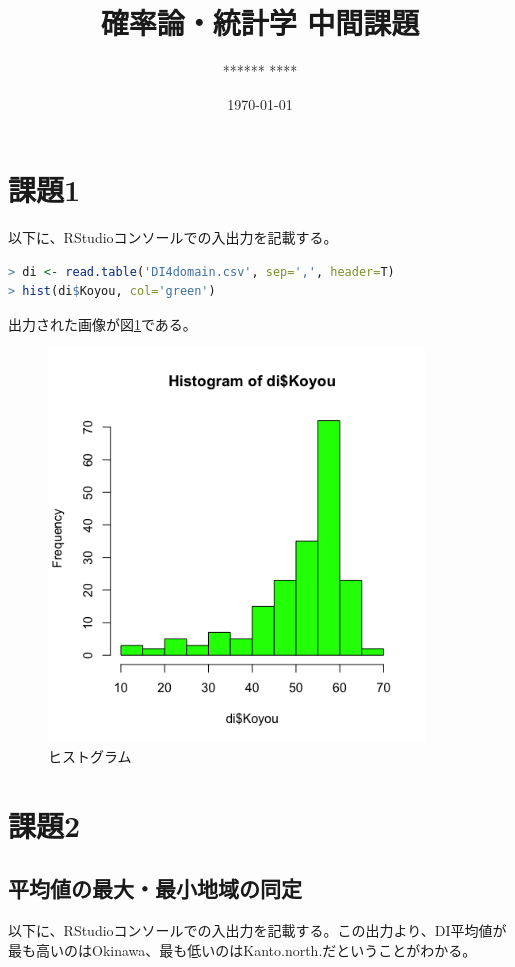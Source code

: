 \documentclass{jsarticle}
\title{\Huge 確率論・統計学 中間課題}
\author{\Large ******* ****}
\date{\today}
\begin{document}
\maketitle

\newpage

\section{課題1}

以下に、RStudioコンソールでの入出力を記載する。

\begin{lstlisting}[language=r]
> di <- read.table('DI4domain.csv', sep=',', header=T)
> hist(di$Koyou, col='green')
\end{lstlisting}

出力された画像が図\ref{ex1}である。

\begin{figure}[H]
 \centering
   \includegraphics[width=100mm]{figures/ex1.png}
 \caption{ヒストグラム}
 \label{ex1}
\end{figure}

\section{課題2}

\subsection{平均値の最大・最小地域の同定}

以下に、RStudioコンソールでの入出力を記載する。この出力より、DI平均値が最も高いのはOkinawa、最も低いのはKanto.north.だということがわかる。
\end{document}
